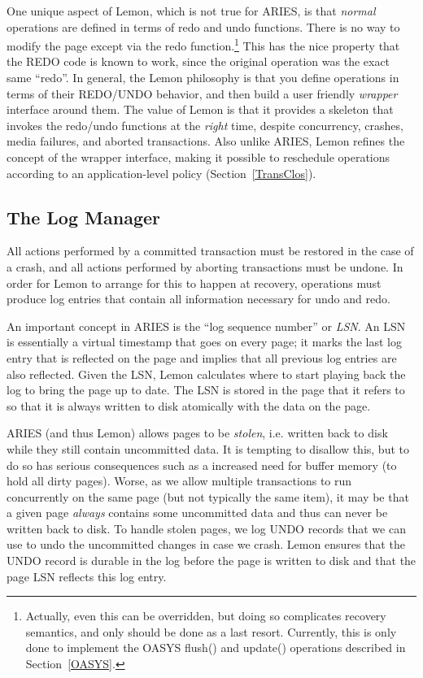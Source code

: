 \documentclass[letterpaper,twocolumn,english]{article}
\newcommand{\yad}{Lemon\xspace}
\begin{document}
One unique aspect of \yad, which is not true for ARIES, is that {\em
normal} operations are defined in terms of redo and undo
functions. There is no way to modify the page except via the redo
function.\footnote{Actually, even this can be overridden, but doing so
complicates recovery semantics, and only should be done as a last
resort.  Currently, this is only done to implement the OASYS flush()
and update() operations described in Section~\ref{OASYS}.}  This has
the nice property that the REDO code is known to work, since the
original operation was the exact same ``redo''.  In general, the \yad
philosophy is that you define operations in terms of their REDO/UNDO
behavior, and then build a user friendly {\em wrapper} interface
around them.  The value of \yad is that it provides a skeleton that
invokes the redo/undo functions at the {\em right} time, despite
concurrency, crashes, media failures, and aborted transactions.  Also
unlike ARIES, \yad refines the concept of the wrapper interface,
making it possible to reschedule operations according to an
application-level policy (Section~\ref{TransClos}).



\subsection{The Log Manager}
\label{log-manager}

All actions performed by a committed transaction must be
restored in the case of a crash, and all actions performed by aborting
transactions must be undone. In order for \yad to arrange for this
to happen at recovery, operations must produce log entries that contain
all information necessary for undo and redo.

An important concept in ARIES is the ``log sequence number'' or {\em
LSN}.  An LSN is essentially a virtual timestamp that goes on every
page; it marks the last log entry that is reflected on the page and
implies that all previous log entries are also reflected.  Given the
LSN, \yad calculates where to start playing back the log to bring the
page up to date.  The LSN is stored in the page that it refers to so
that it is always written to disk atomically with the data on the
page.

ARIES (and thus \yad) allows pages to be {\em stolen}, i.e. written
back to disk while they still contain uncommitted data.  It is
tempting to disallow this, but to do so has serious consequences such as
a increased need for buffer memory (to hold all dirty pages). Worse,
as we allow multiple transactions to run concurrently on the same page
(but not typically the same item), it may be that a given page {\em
always} contains some uncommitted data and thus can never be written
back to disk.  To handle stolen pages, we log UNDO records that
we can use to undo the uncommitted changes in case we crash.  \yad
ensures that the UNDO record is durable in the log before the
page is written to disk and that the page LSN reflects this log entry.
\end{document}
